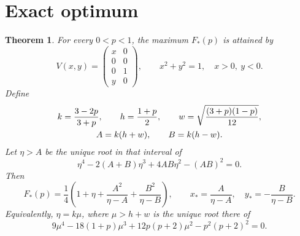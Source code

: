 \documentclass[11pt]{article}
\newtheorem{theorem}{Theorem}
\begin{document}
\section{Exact optimum}
\begin{theorem}\label{thm:main}
For every $0<p<1$, the maximum $F_*(p)$ is attained by
\begin{equation}\label{eq:family}
 V(x,y)=\begin{pmatrix}x&0\\0&0\\0&1\\y&0\end{pmatrix},
 \qquad x^2+y^2=1,\quad x>0,\ y<0.
\end{equation}
Define
\begin{gather}
 k=\frac{3-2p}{3+p},\qquad h=\frac{1+p}{2},\qquad
 w=\sqrt{\frac{(3+p)(1-p)}{12}},\notag\\
 A=k(h+w),\qquad B=k(h-w).\label{eq:AB}
\end{gather}
Let $\eta>A$ be the unique root in that interval of
\begin{equation}\label{eq:quartic}
 \eta^4-2(A+B)\eta^3+4AB\eta^2-(AB)^2=0.
\end{equation}
Then
\begin{equation}\label{eq:answer}
 \boxed{F_*(p)=\frac14\left(1+\eta+
 \frac{A^2}{\eta-A}+\frac{B^2}{\eta-B}\right)},
 \qquad
 x_* =\frac{A}{\eta-A},\quad y_*=-\frac{B}{\eta-B}.
\end{equation}
Equivalently, $\eta=k\mu$, where $\mu>h+w$ is the unique root there of
\begin{equation}\label{eq:quarticp}
 9\mu^4-18(1+p)\mu^3+12p(p+2)\mu^2-p^2(p+2)^2=0.
\end{equation}
\end{theorem}
\end{document}
